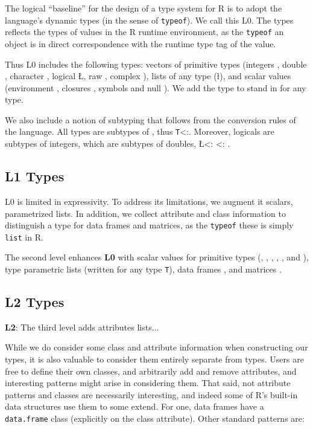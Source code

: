 \documentclass[acmsmall,10pt,review,anonymous]{acmart}\settopmatter{printfolios=true,printccs=false,printacmref=false}
\newcommand{\code}[1]{\lstinline|#1|\xspace}
\begin{document}
The logical ``baseline'' for the design of a type system for R is to adopt
the language's dynamic types (in the sense of \code{typeof}).  We call this
L0.  The types reflects the types of values in the R runtime environment, as
the \code{typeof} an object is in direct correspondence with the runtime
type tag of the value.

Thus L0 includes the following types: vectors of primitive types (integers
\I, double \D, character \C, logical \L, raw \R, complex \X), lists of any
type (\l), and scalar values (environment \sE, closures \sF, symbols \sS and
null \sN). We add the type \ANY to stand in for any type.

We also include a notion of subtyping that follows from the conversion rules
of the language.  All types are subtypes of \ANY, thus {\tt T}<:\ANY.
Moreover, logicals are subtypes of integers, which are subtypes of doubles,
\L <: \I <: \D.

\subsection{L1 Types}

L0 is limited in expressivity. To address its limitations, we augment it
scalars, parametrized lists.  In addition, we collect attribute and class
information to distinguish a type for data frames and matrices, as the
\code{typeof} these is simply {\tt list} in R.

The second level enhances {\bf L0} with scalar values for primitive types
(\sI, \sD, \sC, \sL, \sR, and \sX), type parametric lists (written 
for any type {\tt T}), data frames , and matrices
.


\subsection{L2 Types}
 {\bf L2}: The third level adds attributes lists...


While we do consider some class and attribute information when constructing
our types, it is also valuable to consider them entirely separate from
types.  Users are free to define their own classes, and arbitrarily add and
remove attributes, and interesting patterns might arise in considering them.
That said, not attribute patterns and classes are necessarily interesting,
and indeed some of R's built-in data structures use them to some extend.
For one, data frames have a {\tt data.frame} class (explicitly on the class
attribute).  Other standard patterns are:
\end{document}
